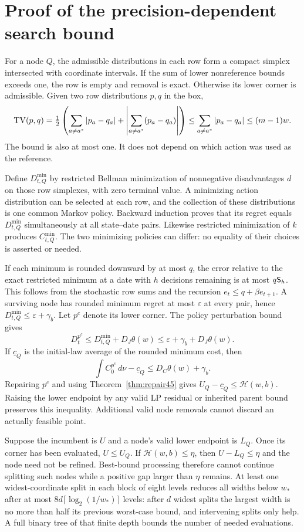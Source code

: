 \appendix
\section{Proof of the precision-dependent search bound}\label{app:search45}
For a node $Q$, the admissible distributions in each row form a compact simplex intersected with coordinate intervals. If the sum of lower nonreference bounds exceeds one, the row is empty and removal is exact. Otherwise its lower corner is admissible. Given two row distributions $p,q$ in the box,
\[
 \operatorname{TV}(p,q)=\tfrac12\left(\sum_{a\ne a^*}|p_a-q_a|+
       \left|\sum_{a\ne a^*}(p_a-q_a)\right|\right)
 \le\sum_{a\ne a^*}|p_a-q_a|\le(m-1)w.
\]
The bound is also at most one. It does not depend on which action was used as the reference.

Define $D^{\min}_{t,Q}$ by restricted Bellman minimization of nonnegative disadvantages $d$ on those row simplexes, with zero terminal value. A minimizing action distribution can be selected at each row, and the collection of these distributions is one common Markov policy. Backward induction proves that its regret equals $D^{\min}_{t,Q}$ simultaneously at all state--date pairs. Likewise restricted minimization of $k$ produces $C^{\min}_{t,Q}$. The two minimizing policies can differ: no equality of their choices is asserted or needed.

If each minimum is rounded downward by at most $q$, the error relative to the exact restricted minimum at a date with $h$ decisions remaining is at most $q\mathsf S_{h}$. This follows from the stochastic row sums and the recursion $e_t\le q+\beta e_{t+1}$. A surviving node has rounded minimum regret at most $\varepsilon$ at every pair, hence $D^{\min}_{t,Q}\le\varepsilon+\gamma_b$. Let $p^c$ denote its lower corner. The policy perturbation bound gives
\[
 D_t^{p^c}\le D^{\min}_{t,Q}+D_J\theta(w)
 \le\varepsilon+\gamma_b+D_J\theta(w).
\]
If $\underline c_Q$ is the initial-law average of the rounded minimum cost, then
\[
 \int C_0^{p^c}\,d\nu-\underline c_Q\le D_C\theta(w)+\gamma_b.
\]
Repairing $p^c$ and using Theorem~\ref{thm:repair45} gives $U_Q-\underline c_Q\le\mathcal H(w,b)$. Raising the lower endpoint by any valid LP residual or inherited parent bound preserves this inequality. Additional valid node removals cannot discard an actually feasible point.

Suppose the incumbent is $U$ and a node's valid lower endpoint is $L_Q$. Once its corner has been evaluated, $U\le U_Q$. If $\mathcal H(w,b)\le\eta$, then $U-L_Q\le\eta$ and the node need not be refined. Best-bound processing therefore cannot continue splitting such nodes while a positive gap larger than $\eta$ remains. At least one widest-coordinate split in each block of eight levels reduces all widths below $w_*$ after at most $8d\lceil\log_2(1/w_*)\rceil$ levels: after $d$ widest splits the largest width is no more than half its previous worst-case bound, and intervening splits only help. A full binary tree of that finite depth bounds the number of needed evaluations.

